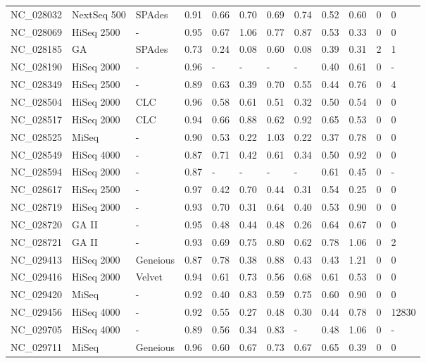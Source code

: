 \begin{table}[ht]
\begin{tabular}{llllllllllll}
  NC\_028032 & NextSeq 500 & SPAdes & 0.91 & 0.66 & 0.70 & 0.69 & 0.74 & 0.52 & 0.60 &   0 &     0 \\ 
  NC\_028069 & HiSeq 2500 & - & 0.95 & 0.67 & 1.06 & 0.77 & 0.87 & 0.53 & 0.33 &   0 &     0 \\ 
  NC\_028185 & GA & SPAdes & 0.73 & 0.24 & 0.08 & 0.60 & 0.08 & 0.39 & 0.31 &   2 &     1 \\ 
  NC\_028190 & HiSeq 2000 & - & 0.96 & - & - & - & - & 0.40 & 0.61 &   0 & - \\ 
  NC\_028349 & HiSeq 2500 & - & 0.89 & 0.63 & 0.39 & 0.70 & 0.55 & 0.44 & 0.76 &   0 &     4 \\ 
  NC\_028504 & HiSeq 2000 & CLC & 0.96 & 0.58 & 0.61 & 0.51 & 0.32 & 0.50 & 0.54 &   0 &     0 \\ 
  NC\_028517 & HiSeq 2000 & CLC & 0.94 & 0.66 & 0.88 & 0.62 & 0.92 & 0.65 & 0.53 &   0 &     0 \\ 
  NC\_028525 & MiSeq & - & 0.90 & 0.53 & 0.22 & 1.03 & 0.22 & 0.37 & 0.78 &   0 &     0 \\ 
  NC\_028549 & HiSeq 4000 & - & 0.87 & 0.71 & 0.42 & 0.61 & 0.34 & 0.50 & 0.92 &   0 &     0 \\ 
  NC\_028594 & HiSeq 2000 & - & 0.87 & - & - & - & - & 0.61 & 0.45 &   0 & - \\ 
  NC\_028617 & HiSeq 2500 & - & 0.97 & 0.42 & 0.70 & 0.44 & 0.31 & 0.54 & 0.25 &   0 &     0 \\ 
  NC\_028719 & HiSeq 2000 & - & 0.93 & 0.70 & 0.31 & 0.64 & 0.40 & 0.53 & 0.90 &   0 &     0 \\ 
  NC\_028720 & GA II & - & 0.95 & 0.48 & 0.44 & 0.48 & 0.26 & 0.64 & 0.67 &   0 &     0 \\ 
  NC\_028721 & GA II & - & 0.93 & 0.69 & 0.75 & 0.80 & 0.62 & 0.78 & 1.06 &   0 &     2 \\ 
  NC\_029413 & HiSeq 2000 & Geneious & 0.87 & 0.78 & 0.38 & 0.88 & 0.43 & 0.43 & 1.21 &   0 &     0 \\ 
  NC\_029416 & HiSeq 2000 & Velvet & 0.94 & 0.61 & 0.73 & 0.56 & 0.68 & 0.61 & 0.53 &   0 &     0 \\ 
  NC\_029420 & MiSeq & - & 0.92 & 0.40 & 0.83 & 0.59 & 0.75 & 0.60 & 0.90 &   0 &     0 \\ 
  NC\_029456 & HiSeq 4000 & - & 0.92 & 0.55 & 0.27 & 0.48 & 0.30 & 0.44 & 0.78 &   0 & 12830 \\ 
  NC\_029705 & HiSeq 4000 & - & 0.89 & 0.56 & 0.34 & 0.83 & - & 0.48 & 1.06 &   0 & - \\ 
  NC\_029711 & MiSeq & Geneious & 0.96 & 0.60 & 0.67 & 0.73 & 0.67 & 0.65 & 0.39 &   0 &     0 \\ 

\end{tabular}
\end{table}
